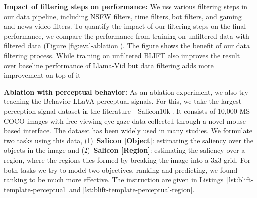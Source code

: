 


\textbf{Impact of filtering steps on performance:} We use various filtering steps in our data pipeline, including NSFW filters, time filters, bot filters, and gaming and news video filters. To quantify the impact of our filtering steps on the final performance, we compare the performance from training on unfiltered data with filtered data (Figure \ref{fig:eval-ablation}).
The figure shows the benefit of our data filtering
process. While training on unfiltered BLIFT also improves the result over baseline performance of Llama-Vid
but data filtering adds more improvement on top of it

\textbf{Ablation with perceptual behavior:} As an ablation experiment, we also try teaching the Behavior-LLaVA perceptual signals. For this, we take the largest perception signal dataset in the literature - Salicon10k \cite{jiang2015salicon}. It consists of 10,000 MS COCO images \cite{chen2015microsoft} with free-viewing eye gaze data collected through a novel mouse-based interface. The dataset has been widely used in many studies. We formulate two tasks using this data, (1)~\textbf{Salicon [Object]}: estimating the saliency over the objects in the image and (2)~\textbf{Salicon [Region]}: estimating the saliency over a region, where the regions tiles formed by breaking the image into a 3x3 grid. For both tasks we try to model two objectives, ranking and predicting, we found ranking to be much more effective. The instruction are given in Listings~\ref{lst:blift-template-perceptual} and \ref{lst:blift-template-perceptual-region}.




